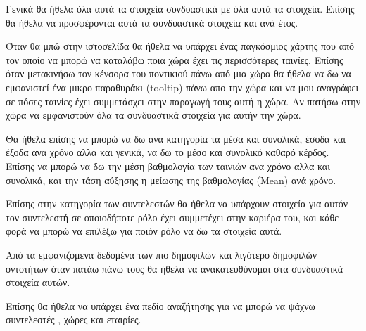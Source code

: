 Γενικά θα ήθελα όλα αυτά τα στοιχεία συνδυαστικά με όλα αυτά τα στοιχεία. Επίσης θα ήθελα να προσφέρονται αυτά τα συνδυαστικά στοιχεία και ανά έτος.

Όταν θα μπώ στην ιστοσελίδα θα ήθελα να υπάρχει ένας παγκόσμιος χάρτης που από τον οποίο να μπορώ να καταλάβω ποια χώρα έχει τις περισσότερες ταινίες. Επίσης όταν μετακινήσω τον κένσορα του ποντικιού πάνω από μια χώρα θα ήθελα να δω να εμφανιστεί ένα μικρο παραθυράκι (tooltip) πάνω απο την χώρα και να μου αναγράφει σε πόσες ταινίες έχει συμμετάσχει στην παραγωγή τους αυτή η χώρα. Αν πατήσω στην χώρα να εμφανιστούν όλα τα συνδυαστικά στοιχεία για αυτήν την χώρα. 

Θα ήθελα επίσης να μπορώ να δω ανα κατηγορία τα μέσα και συνολικά, έσοδα και έξοδα ανα χρόνο αλλα και γενικά, να δω το μέσο και συνολικό καθαρό κέρδος. Επίσης να μπορώ να δω την μέση βαθμολογία των ταινιών ανα χρόνο αλλα και συνολικά, και την τάση αύξησης η μείωσης της βαθμολογίας (Mean) ανά χρόνο.

Επίσης στην κατηγορία των συντελεστών θα ήθελα να υπάρχουν στοιχεία για αυτόν τον συντελεστή σε οποιοδήποτε ρόλο έχει συμμετέχει στην καριέρα του, και κάθε φορά να μπορώ να επιλέξω για ποιόν ρόλο να δω τα στοιχεία αυτά.

Από τα εμφανιζόμενα δεδομένα των πιο δημοφιλών και λιγότερο δημοφιλών οντοτήτων όταν πατάω πάνω τους θα ήθελα να ανακατευθύνομαι στα συνδυαστικά στοιχεία αυτών. 

Επίσης θα ήθελα να υπάρχει ένα πεδίο αναζήτησης για να μπορώ να ψάχνω συντελεστές , χώρες και εταιρίες.
